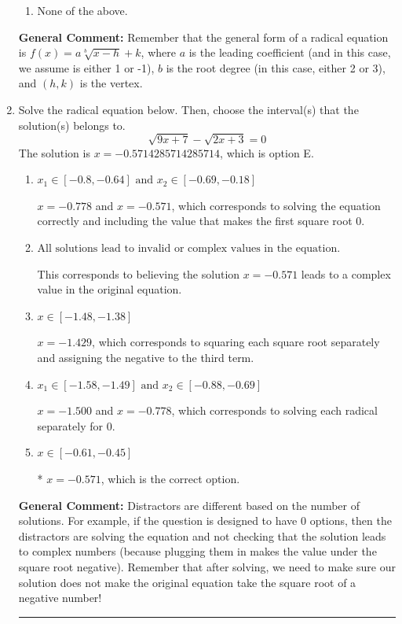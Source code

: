 \documentclass{extbook}[14pt]
\newcommand{\litem}[1]{\item #1

\rule{\textwidth}{0.4pt}}
\begin{document}
\begin{enumerate}
{\begin{enumerate}[label=\Alph*.]
\item None of the above.\end{enumerate}
\textbf{General Comment:} Remember that the general form of a radical equation is $ f(x) = a \sqrt[b]{x - h} + k $, where $a$ is the leading coefficient (and in this case, we assume is either 1 or -1), $b$ is the root degree (in this case, either 2 or 3), and $(h, k)$ is the vertex.
}
\litem{
Solve the radical equation below. Then, choose the interval(s) that the solution(s) belongs to.
\[ \sqrt{9 x + 7} - \sqrt{2 x + 3} = 0 \]The solution is \( x = -0.5714285714285714 \), which is option E.\begin{enumerate}[label=\Alph*.]
\item \( x_1 \in [-0.8, -0.64] \text{ and } x_2 \in [-0.69,-0.18] \)

$x = -0.778$ and $x = -0.571$, which corresponds to solving the equation correctly and including the value that makes the first square root 0.
\item \( \text{All solutions lead to invalid or complex values in the equation.} \)

This corresponds to believing the solution $x = -0.571$ leads to a complex value in the original equation.
\item \( x \in [-1.48,-1.38] \)

$x = -1.429$, which corresponds to squaring each square root separately and assigning the negative to the third term.
\item \( x_1 \in [-1.58, -1.49] \text{ and } x_2 \in [-0.88,-0.69] \)

$x = -1.500$ and $x = -0.778$, which corresponds to solving each radical separately for 0.
\item \( x \in [-0.61,-0.45] \)

* $x = -0.571$, which is the correct option.
\end{enumerate}

\textbf{General Comment:} Distractors are different based on the number of solutions. For example, if the question is designed to have 0 options, then the distractors are solving the equation and not checking that the solution leads to complex numbers (because plugging them in makes the value under the square root negative). Remember that after solving, we need to make sure our solution does not make the original equation take the square root of a negative number!
}
\end{enumerate}
\end{document}
